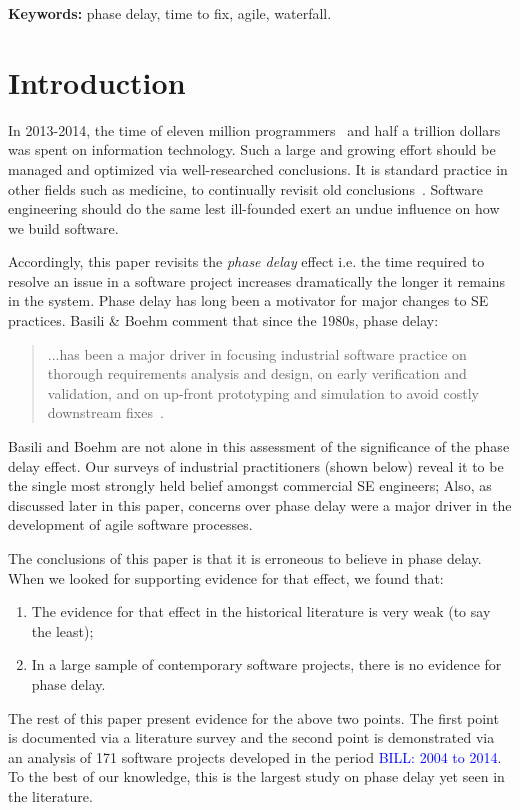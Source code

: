 \documentclass{sig-alternate}
\newcommand{\bill}[1]{\textcolor{blue}{BILL: #1}}
\newcommand{\be}{\begin{enumerate}}
\newcommand{\ee}{\end{enumerate}}
\begin{document}
\vspace{1mm}
\noindent
{\bf Keywords:} phase delay, time to fix, agile, waterfall.

\section{Introduction}
In 2013-2014, the time of 
eleven  million programmers~\cite{pettey14} and
half a trillion dollars~\cite{avram14} was spent on information technology.
Such a large and growing effort should be managed and optimized via  well-researched conclusions.  
It is standard practice
in other fields such as medicine,
to continually revisit old conclusions~\cite{prasad13}. Software engineering should do the same lest
ill-founded  exert an undue influence on how we build software.  

Accordingly, this paper revisits
the {\em phase delay} effect
i.e.  the time required to resolve an issue in a software project increases dramatically 
the longer it remains in the system. 
Phase delay has long been
a    motivator for major changes to
SE practices. Basili \& Boehm comment that since the 1980s,  phase delay:
\begin{quote}
...has been a major driver in focusing
industrial software practice on thorough
requirements analysis and design,
on early verification and validation, and
on up-front prototyping and simulation
to avoid costly downstream fixes~\cite{boehm01}.
\end{quote}
Basili and Boehm are not alone in this assessment of the significance of the phase delay effect. 
Our surveys of  industrial practitioners (shown below) reveal it to be
the single most strongly held belief amongst commercial SE engineers;
Also,
as discussed later
in this paper, concerns over phase delay were a major driver in the development of agile software
processes.

The conclusions of this paper is that it is erroneous to believe in phase delay.
When we looked for supporting evidence for that effect, we found that:
\be 
\item The evidence for that effect in the historical literature is very weak (to say the least);
\item  In  a large sample of   contemporary software projects, there is no evidence for phase delay.
 \ee
The rest of this paper present evidence for the above two points. 
The first point is  documented via  a literature survey and the second point is demonstrated
via an analysis of  
 171 software  projects developed in the period \bill{2004 to 2014}.  To the best of our knowledge,
 this is the largest study on phase delay yet seen in the literature.
 
\end{document}
